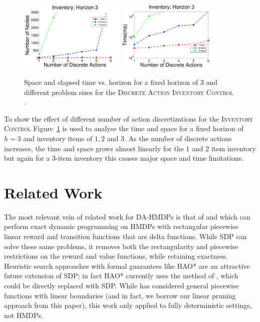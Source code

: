 \documentclass[twoside,11pt]{article}
\newcommand{\InventoryControl}{\textsc{Inventory Control }}
\begin{document}
\begin{figure}[tbp!]
\vspace{-2mm}
\centering
\includegraphics[width=0.45\textwidth]{Figures2/camdp/invH3Node.pdf}
\hspace{2mm}
\includegraphics[width=0.45\textwidth]{Figures2/camdp/invH3Time.pdf}
\vspace{-2mm}
\caption{%
Space and elapsed time vs. horizon for a fixed horizon of 3 and different problem sizes for the \textsc{Discrete Action} \InventoryControl. 
}
\label{fig:invH3}
\vspace{-2mm}
\end{figure}

To show the effect of different number of action discretizations for the \InventoryControl Figure~\ref{fig:invH3} is used to analyse the time and space for a fixed horizon of $h=3$ and inventory items of $1,2$ and 3. As the number of discrete actions increases, the time and space grows almost linearly for the 1 and 2 item inventory but again for a 3-item inventory this causes major space and time limitations. 
\section{Related Work}

The most relevant vein of related work for DA-HMDPs is that of \cite{feng04} and \cite{li05} which can perform exact dynamic programming on
HMDPs with rectangular piecewise linear reward and transition functions
that are delta functions.  While SDP can solve these same problems,
it removes both the rectangularity and piecewise restrictions on the
reward and value functions, while retaining exactness.  
Heuristic search approaches with formal guarantees 
like HAO* \cite{hao09} are an attractive future extension of SDP;
in fact HAO* currently uses the method of \cite{feng04}, which could
be directly replaced with SDP.  While \cite{penberthy94} has considered
general piecewise functions with linear boundaries (and in fact,
we borrow our linear pruning approach from this paper), this work
only applied to fully deterministic settings, not HMDPs.
\end{document}
